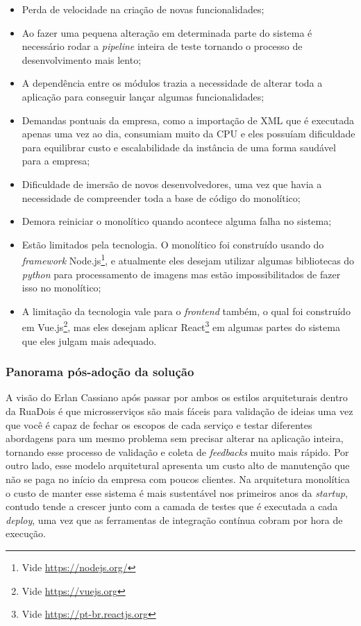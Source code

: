 \begin{itemize}
    \item Perda de velocidade na criação de novas funcionalidades;
    \item Ao fazer uma pequena alteração em determinada parte do sistema é necessário rodar a
        \textit{pipeline} inteira de teste tornando o processo de desenvolvimento mais lento;
    \item A dependência entre os módulos trazia a necessidade de alterar toda a aplicação para
        conseguir lançar algumas funcionalidades;
    \item Demandas pontuais da empresa, como a importação de XML que é executada apenas uma vez ao
        dia, consumiam muito da CPU e eles possuíam dificuldade para equilibrar custo e
        escalabilidade da instância de uma forma saudável para a empresa;
    \item Dificuldade de imersão de novos desenvolvedores, uma vez que havia a necessidade de
        compreender toda a base de código do monolítico;
    \item Demora reiniciar o monolítico quando acontece alguma falha no sistema;
    \item Estão limitados pela tecnologia. O monolítico foi construído usando do \textit{framework}
        Node.js\footnote{Vide \url{https://nodejs.org/}}, e atualmente eles desejam utilizar algumas
        bibliotecas do \textit{python} para processamento de imagens mas estão impossibilitados de
        fazer isso no monolítico;
    \item A limitação da tecnologia vale para o \textit{frontend} também, o qual foi construído em
        Vue.js\footnote{Vide \url{https://vuejs.org}}, mas eles desejam aplicar React\footnote{Vide
        \url{https://pt-br.reactjs.org}} em algumas partes do sistema que eles julgam mais adequado.
\end{itemize}

\subsubsection{Panorama pós-adoção da solução}

A visão do Erlan Cassiano após passar por ambos os estilos arquiteturais dentro da RuaDois é que
microsserviços são mais fáceis para validação de ideias uma vez que você é capaz de fechar os
escopos de cada serviço e testar diferentes abordagens para um mesmo problema sem precisar alterar na
aplicação inteira, tornando esse processo de validação e coleta de \textit{feedbacks} muito mais
rápido. Por outro lado, esse modelo arquitetural apresenta um custo alto de manutenção que não se
paga no início da empresa com poucos clientes. Na arquitetura monolítica o custo de manter esse
sistema é mais sustentável nos primeiros anos da \textit{startup}, contudo tende a crescer junto com
a camada de testes que é executada a cada \textit{deploy}, uma vez que as ferramentas de integração
contínua cobram por hora de execução.

